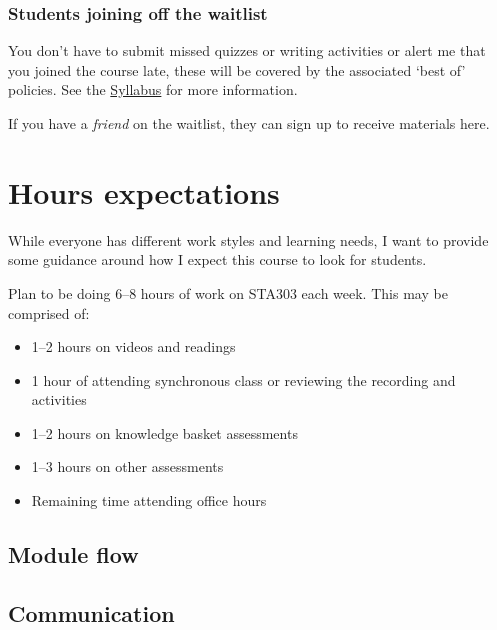 \documentclass[
]{book}
\begin{document}
\hypertarget{students-joining-off-the-waitlist}{%
\subsubsection{Students joining off the waitlist}\label{students-joining-off-the-waitlist}}

You don't have to submit missed quizzes or writing activities or alert me that you joined the course late, these will be covered by the associated `best of' policies. See the \protect\hyperlink{syllabus}{Syllabus} for more information.

If you have a \emph{friend} on the waitlist, they can sign up to receive materials here.

\hypertarget{hours-expectations}{%
\section{Hours expectations}\label{hours-expectations}}

While everyone has different work styles and learning needs, I want to provide some guidance around how I expect this course to look for students.

Plan to be doing 6--8 hours of work on STA303 each week. This may be comprised of:

\begin{itemize}
\item
  1--2 hours on videos and readings
\item
  1 hour of attending synchronous class or reviewing the recording and activities
\item
  1--2 hours on knowledge basket assessments
\item
  1--3 hours on other assessments
\item
  Remaining time attending office hours
\end{itemize}

\hypertarget{module-flow}{%
\subsection{Module flow}\label{module-flow}}

\hypertarget{communication}{%
\subsection{Communication}\label{communication}}
\end{document}
